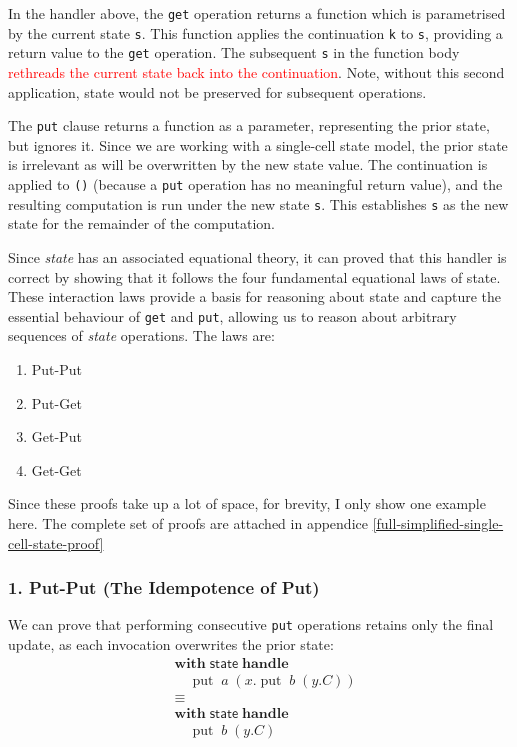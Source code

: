\documentclass[logo,bsc,singlespacing,parskip]{infthesis}
\begin{document}
In the handler above, the \lstinline{get} operation returns a function which is parametrised by the current state \lstinline{s}. This function applies the continuation \lstinline{k}  to \lstinline{s}, providing a return value to the \lstinline{get} operation. The subsequent \lstinline{s} in the function body \textcolor{red}{rethreads the current state back into the continuation}. Note, without this second application, state would not be preserved for subsequent operations. 

The \lstinline{put} clause returns a function as a parameter, representing the prior state, but ignores it. Since we are working with a single-cell state model, the prior state is irrelevant as will be overwritten by the new state value. The continuation is applied to \lstinline{()} (because a \lstinline{put} operation has no meaningful return value), and the resulting computation is run under the new state \lstinline{s}. This establishes \lstinline{s} as the new state for the remainder of the computation.

Since \textit{state} has an associated equational theory, it can proved that this handler is correct by showing that it follows the four fundamental equational laws of state. These interaction laws provide a basis for reasoning about state and capture the essential behaviour of \lstinline{get} and \lstinline{put}, allowing us to reason about arbitrary sequences of \textit{state} operations. The laws are:

\begin{enumerate}
    \item Put-Put 
    \item Put-Get
    \item Get-Put
    \item Get-Get
\end{enumerate}

Since these proofs take up a lot of space, for brevity, I only show one example here. The complete set of proofs are attached in appendice \ref{full-simplified-single-cell-state-proof} 

\subsubsection*{1. Put-Put (The Idempotence of Put)}
We can prove that performing consecutive \lstinline{put} operations retains only the final update, as each invocation overwrites the prior state:
\[
\begin{aligned}
    &\mathsf{\textbf{with}} \; \mathsf{state} \; \mathsf{\textbf{handle}} \\
    &\quad \operatorname{put} \; a \; (x. \operatorname{put} \; b \; (y. C)) \\
    &\equiv \\
    &\mathsf{\textbf{with}} \; \mathsf{state} \; \mathsf{\textbf{handle}} \\
    &\quad \operatorname{put} \; b \; (y. C)
\end{aligned}
\]
\end{document}
